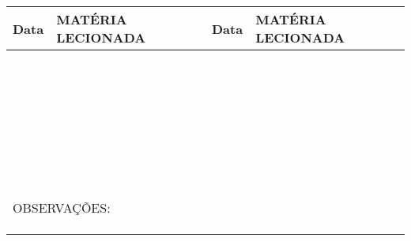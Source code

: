 \vspace{0.25cm}
\begin{small}
    \begin{tabular}{|l|l|l|l|}
       \hline
       \textbf{Data} & \hspace{4.5cm} \textbf{MAT\'ERIA LECIONADA} \hspace{4.5cm} &
       \textbf{Data} & \hspace{4.5cm} \textbf{MAT\'ERIA LECIONADA} \hspace{4.5cm} \\
       \hline
       &&& \\
       \hline
       &&& \\
       \hline
       &&& \\
       \hline
       &&& \\
       \hline
       &&& \\
       \hline
       &&& \\
       \hline
       &&& \\
       \hline
       &&& \\
       \hline
       &&& \\
       \hline
       &&& \\
       \hline
       &&& \\
       \hline
       &&& \\
       \hline
       &&& \\
       \hline
       &&& \\
       \hline
       &&& \\
       \hline
       &&& \\
       \hline
       &&& \\
       \hline
       &&& \\
       \hline
       &&& \\
       \hline
       &&& \\
       \hline
       &&& \\
       \hline
       &&& \\
       \hline
       &&& \\
       \hline
       &&& \\
       \hline
       &&& \\
       \hline
       &&& \\
       \hline
       &&& \\
       \hline
       &&& \\
       \hline
       &&& \\
       \hline
       &&& \\
       \hline
       &&& \\
       \hline
       \multicolumn{4}{|l|}{OBSERVA\c{C}\~OES:} \\
       \multicolumn{4}{|l|}{} \\
       \hline
       \multicolumn{4}{|l|}{} \\
       \hline
       \multicolumn{4}{|l|}{} \\
       \hline
    \end{tabular}
\vspace{0.25cm}


\end{small}
